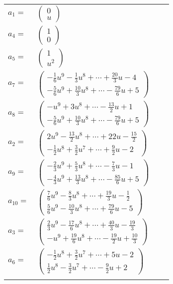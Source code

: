 \documentclass[1p]{elsarticle_modified}
\theoremstyle{definition}
\begin{document}
\begin{tabular}{m{7pt} m{180pt} m{7pt} m{180pt} }
\flushright $a_{1}=$&$\begin{pmatrix}0\\u\end{pmatrix}$ \\
\flushright $a_{4}=$&$\begin{pmatrix}1\\0\end{pmatrix}$ \\
\flushright $a_{5}=$&$\begin{pmatrix}1\\u^2\end{pmatrix}$ \\
\flushright $a_{7}=$&$\begin{pmatrix}-\frac{1}{6} u^9-\frac{1}{3} u^8+\cdots+\frac{20}{3} u-4\\-\frac{5}{6} u^9+\frac{10}{3} u^8+\cdots-\frac{79}{6} u+5\end{pmatrix}$ \\
\flushright $a_{8}=$&$\begin{pmatrix}- u^9+3 u^8+\cdots-\frac{13}{2} u+1\\-\frac{5}{6} u^9+\frac{10}{3} u^8+\cdots-\frac{79}{6} u+5\end{pmatrix}$ \\
\flushright $a_{2}=$&$\begin{pmatrix}2 u^9-\frac{13}{2} u^8+\cdots+22 u-\frac{15}{2}\\-\frac{1}{2} u^8+\frac{3}{2} u^7+\cdots+\frac{9}{2} u-2\end{pmatrix}$ \\
\flushright $a_{9}=$&$\begin{pmatrix}-\frac{2}{3} u^9+\frac{5}{3} u^8+\cdots-\frac{7}{3} u-1\\-\frac{4}{3} u^9+\frac{13}{3} u^8+\cdots-\frac{85}{6} u+5\end{pmatrix}$ \\
\flushright $a_{10}=$&$\begin{pmatrix}\frac{7}{6} u^9-\frac{8}{3} u^8+\cdots+\frac{19}{3} u-\frac{1}{2}\\\frac{5}{6} u^9-\frac{10}{3} u^8+\cdots+\frac{79}{6} u-5\end{pmatrix}$ \\
\flushright $a_{3}=$&$\begin{pmatrix}\frac{2}{3} u^9-\frac{17}{6} u^8+\cdots+\frac{40}{3} u-\frac{19}{3}\\- u^9+\frac{19}{6} u^8+\cdots-\frac{19}{2} u+\frac{10}{3}\end{pmatrix}$ \\
\flushright $a_{6}=$&$\begin{pmatrix}-\frac{1}{2} u^8+\frac{3}{2} u^7+\cdots+5 u-2\\\frac{1}{2} u^8-\frac{3}{2} u^7+\cdots-\frac{9}{2} u+2\end{pmatrix}$\\&\end{tabular}
\end{document}
